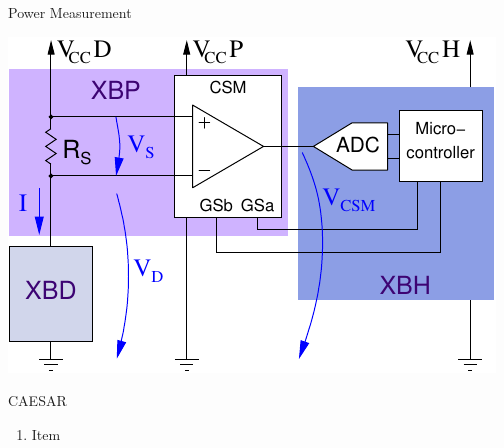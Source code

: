 \documentclass[xcolor=pdftex,dvipsnames,table,final]{beamer}
\begin{document}
\begin{frame}[fragile]{}
\begin{columns}[t, totalwidth=\textwidth]
\begin{column}{.675\linewidth}
\begin{columns}
\begin{column}{.473\linewidth}
\begin{block}{Power Measurement}
\begin{minipage}{0.5\linewidth}
          \begin{center}
            \includegraphics[scale=1.5]{../figures/ina225}
          \end{center} 
	\end{minipage} 
       \end{block}
       \begin{block}{CAESAR}
        \begin{enumerate}
          \item Item
        \end{enumerate}
       \end{block}


\end{column}
\end{columns}
\end{column}
\end{columns}
\end{frame}
\end{document}

